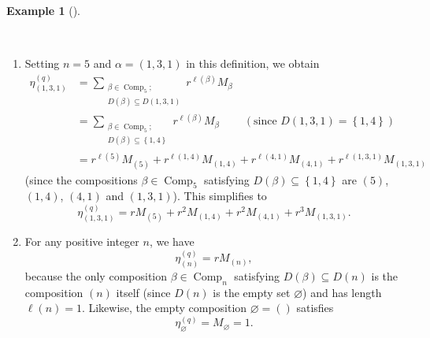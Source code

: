 \documentclass[numbers=enddot,12pt,final,onecolumn,notitlepage]{scrartcl}%
\theoremstyle{definition}
\newtheorem{exam}[theo]{Example}
\newenvironment{example}[1][]
{\begin{exam}[#1]\begin{leftbar}}
{\end{leftbar}\end{exam}}
\let\sumnonlimits\sum
\renewcommand{\sum}{\sumnonlimits\limits}
\begin{document}
\begin{example}
\label{exa.etaalpha.1}\ \ 

\begin{enumerate}
\item[\textbf{(a)}] Setting $n=5$ and $\alpha=\left(  1,3,1\right)  $ in this
definition, we obtain%
\begin{align*}
\eta_{\left(  1,3,1\right)  }^{\left(  q\right)  }  &  =\sum_{\substack{\beta
\in\operatorname*{Comp}\nolimits_{5};\\D\left(  \beta\right)  \subseteq
D\left(  1,3,1\right)  }}r^{\ell\left(  \beta\right)  }M_{\beta}\\
&  =\sum_{\substack{\beta\in\operatorname*{Comp}\nolimits_{5};\\D\left(
\beta\right)  \subseteq\left\{  1,4\right\}  }}r^{\ell\left(  \beta\right)
}M_{\beta}\ \ \ \ \ \ \ \ \ \ \left(  \text{since }D\left(  1,3,1\right)
=\left\{  1,4\right\}  \right) \\
&  =r^{\ell\left(  5\right)  }M_{\left(  5\right)  }+r^{\ell\left(
1,4\right)  }M_{\left(  1,4\right)  }+r^{\ell\left(  4,1\right)  }M_{\left(
4,1\right)  }+r^{\ell\left(  1,3,1\right)  }M_{\left(  1,3,1\right)  }%
\end{align*}
(since the compositions $\beta\in\operatorname*{Comp}\nolimits_{5}$ satisfying
$D\left(  \beta\right)  \subseteq\left\{  1,4\right\}  $ are $\left(
5\right)  $, $\left(  1,4\right)  $, $\left(  4,1\right)  $ and $\left(
1,3,1\right)  $). This simplifies to%
\[
\eta_{\left(  1,3,1\right)  }^{\left(  q\right)  }=rM_{\left(  5\right)
}+r^{2}M_{\left(  1,4\right)  }+r^{2}M_{\left(  4,1\right)  }+r^{3}M_{\left(
1,3,1\right)  }.
\]


\item[\textbf{(b)}] For any positive integer $n$, we have
\[
\eta_{\left(  n\right)  }^{\left(  q\right)  }=rM_{\left(  n\right)  },
\]
because the only composition $\beta\in\operatorname*{Comp}\nolimits_{n}$
satisfying $D\left(  \beta\right)  \subseteq D\left(  n\right)  $ is the
composition $\left(  n\right)  $ itself (since $D\left(  n\right)  $ is the
empty set $\varnothing$) and has length $\ell\left(  n\right)  =1$. Likewise,
the empty composition $\varnothing=\left(  {}\right)  $ satisfies
\[
\eta_{\varnothing}^{\left(  q\right)  }=M_{\varnothing}=1.
\]

\end{enumerate}
\end{example}
\end{document}

